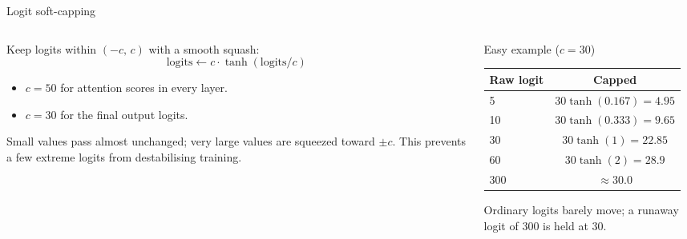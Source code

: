 \documentclass[aspectratio=169,11pt]{beamer}
\begin{document}
\begin{frame}{Logit soft-capping}
  \begin{columns}[T]
    \begin{column}{0.52\textwidth}
      \small
      Keep logits within $(-c,\,c)$ with a smooth squash:
      \[
        \text{logits}\leftarrow c\cdot\tanh(\text{logits}/c)
      \]
      \begin{itemize}
        \item $c=50$ for attention scores in every layer.
        \item $c=30$ for the final output logits.
      \end{itemize}
      Small values pass almost unchanged; very large values are squeezed toward $\pm c$. This prevents a few extreme logits from destabilising training.
    \end{column}
    \begin{column}{0.44\textwidth}
      \begin{exampleblock}{Easy example ($c=30$)}
        \small
        \begin{tabular}{@{}lc@{}}
          \toprule
          Raw logit & Capped\\
          \midrule
          5 & $30\tanh(0.167)=4.95$\\
          10 & $30\tanh(0.333)=9.65$\\
          30 & $30\tanh(1)=22.85$\\
          60 & $30\tanh(2)=28.9$\\
          300 & $\approx30.0$\\
          \bottomrule
        \end{tabular}
        \vspace{1mm}

        Ordinary logits barely move; a runaway logit of 300 is held at 30.
      \end{exampleblock}
    \end{column}
  \end{columns}
\end{frame}
\end{document}
